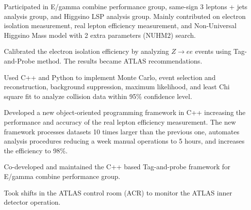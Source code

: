\documentclass[letterpaper]{deedy-resume-openfont}
\begin{document}
\begin{tightemize}
\item Participated in E/gamma combine performance group, same-sign 3 leptons + jets analysis group, and Higgsino LSP analysis group.
Mainly contributed on electron isolation measurement, real lepton efficiency measurement, and Non-Universal Higgsino Mass model with 2 extra parameters (NUHM2) search.
\item Calibrated the electron isolation efficiency by analyzing $Z \to ee$ events using Tag-and-Probe method. The results became ATLAS recommendations. %
\item Used C++ and Python to implement Monte Carlo, event selection and reconstruction, background suppression, maximum likelihood, and least Chi square fit to analyze collision data within 95\% confidence level.
\item Developed a new object-oriented programming framework in C++ increasing the performance and accuracy of the real lepton efficiency measurement.
The new framework processes datasets 10 times larger than the previous one, automates analysis procedures reducing a week manual operations to 5 hours, and increases the efficiency to 98\%.
\item Co-developed and maintained the C++ based Tag-and-probe framework for E/gamma combine performance group.
\item Took shifts in the ATLAS control room (ACR) to monitor the ATLAS inner detector operation.
\end{tightemize}
\sectionsep
\end{document}
